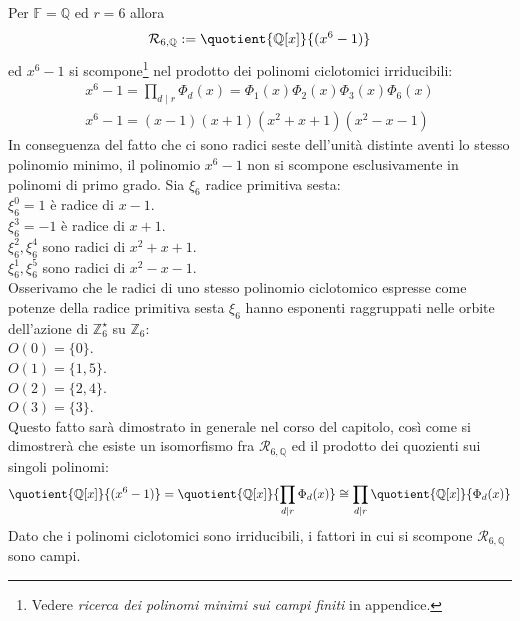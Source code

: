 \begin{esempio}
   Per $\mathbb{F} = \mathbb{Q}$ ed $r = 6$ allora
   \begin{align*}
      \mathcal{R}_{6, \mathbb{Q}}
       := \quotient{\mathbb{Q} \lbrack x \rbrack  }{(x^{6} - 1)}
   \end{align*}
  ed $x^{6}-1$ si scompone\footnote{Vedere \emph{ricerca dei polinomi minimi sui campi finiti} in appendice.} nel prodotto dei polinomi ciclotomici irriducibili:
\begin{align*}
  x^{6} - 1 =   \prod_{d \mid r} \Phi_{d}(x) =
  \Phi_{1}(x)\Phi_{2}(x)\Phi_{3}(x)\Phi_{6}(x) \\
  x^{6} - 1 = (x-1)(x+1)(x^2+x+1)(x^2-x-1)
\end{align*}
In conseguenza del fatto che ci sono radici seste dell'unità
distinte aventi lo stesso polinomio minimo,  il polinomio $x^{6} - 1$ non si
scompone esclusivamente in polinomi di primo grado. Sia $\xi_{6}$ radice
primitiva sesta:\\
$\xi_{6}^{0} = 1$ è radice di $x-1$.\\
$\xi_{6}^{3} = -1$ è radice di $x + 1$.\\
$\xi_{6}^{2}, \xi_{6}^{4} $ sono radici di $x^2+x+1$.\\
$\xi_{6}^{1}, \xi_{6}^{5}$ sono radici di $x^2-x-1$.\\
Osserivamo che le radici di uno stesso polinomio ciclotomico espresse come potenze della radice primitiva sesta $\xi_{6}$ hanno esponenti raggruppati nelle orbite dell'azione di
$\mathbb{Z}_{6}^{\star}$ su $\mathbb{Z}_{6}$: \\
$O(0)= \lbrace 0 \rbrace$.\\
$O(1)= \lbrace 1,5 \rbrace$.\\
$O(2)= \lbrace 2,4 \rbrace$.\\
$O(3)= \lbrace 3 \rbrace$.\\
Questo fatto sarà dimostrato in generale nel corso del capitolo, così come si
dimostrerà che esiste un isomorfismo fra
$\mathcal{R}_{6, \mathbb{Q}} $ ed il prodotto dei quozienti sui singoli
polinomi:
\begin{align*}
\quotient{\mathbb{Q} \lbrack x \rbrack  }{(x^{6} - 1)} =
\quotient{\mathbb{Q} \lbrack x \rbrack  }{ \prod_{d\mid r} \Phi_{d}(x)} \cong
\prod_{d\mid r} \quotient{\mathbb{Q} \lbrack x \rbrack  }{\Phi_{d}(x)}
\end{align*}
Dato che i polinomi ciclotomici sono irriducibili, i fattori in cui si scompone
$ \mathcal{R}_{6, \mathbb{Q}} $ sono campi.
\end{esempio}

